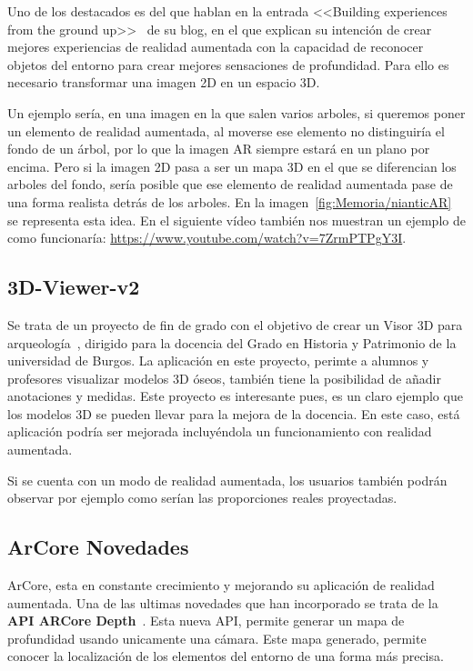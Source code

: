 Uno de los destacados es del que hablan en la entrada <<Building experiences from the ground up>>~\cite{nianticAR} de su blog, en el que explican su intención de crear mejores experiencias de realidad aumentada con la capacidad de reconocer objetos del entorno para crear mejores sensaciones de profundidad. Para ello es necesario transformar una imagen 2D en un espacio 3D. 

Un ejemplo sería, en una imagen en la que salen varios arboles, si queremos poner un elemento de realidad aumentada, al moverse ese elemento no distinguiría el fondo de un árbol, por lo que la imagen AR siempre estará en un plano por encima. Pero si la imagen 2D pasa a ser un mapa 3D en el que se diferencian los arboles del fondo, sería posible que ese elemento de realidad aumentada pase de una forma realista detrás de los arboles. En la imagen~\ref{fig:Memoria/nianticAR} se representa esta idea. En el siguiente vídeo también nos muestran un ejemplo de como funcionaría: \url{https://www.youtube.com/watch?v=7ZrmPTPgY3I}. 




\subsection{3D-Viewer-v2}

Se trata de un proyecto de fin de grado con el objetivo de crear un Visor 3D para arqueología~\cite{3D-Viewer-v2}, dirigido para la docencia del Grado en Historia y Patrimonio de la universidad de Burgos.
La aplicación en este proyecto, perimte a alumnos y profesores visualizar modelos 3D óseos, también tiene la posibilidad de añadir anotaciones y medidas. Este proyecto es interesante pues, es un claro ejemplo que los modelos 3D se pueden llevar para la mejora de la docencia. En este caso, está aplicación podría ser mejorada incluyéndola un funcionamiento con realidad aumentada.

Si se cuenta con un modo de realidad aumentada, los usuarios también podrán observar por ejemplo como serían las proporciones reales proyectadas.

\subsection{ArCore Novedades}
ArCore, esta en constante crecimiento y mejorando su aplicación de realidad aumentada. Una de las ultimas novedades que han incorporado se trata de la \textbf{API ARCore Depth}~\cite{apiArCoreDepth}. Esta nueva API, permite generar un mapa de profundidad usando unicamente una cámara. Este mapa generado, permite conocer la localización de los elementos del entorno de una forma más precisa.

